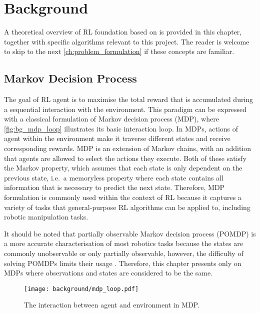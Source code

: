 \chapter{Background}\label{ch:background}

A theoretical overview of RL foundation based on \citet{sutton_reinforcement_2018} is provided in this chapter, together with specific algorithms relevant to this project. The reader is welcome to skip to the next \autoref{ch:problem_formulation} if these concepts are familiar.


\section{Markov Decision Process}

The goal of RL agent is to maximise the total reward that is accumulated during a sequential interaction with the environment. This paradigm can be expressed with a classical formulation of Markov decision process (MDP), where \autoref{fig:bg_mdp_loop} illustrates its basic interaction loop. In MDPs, actions of agent within the environment make it traverse different states and receive corresponding rewards. MDP is an extension of Markov chains, with an addition that agents are allowed to select the actions they execute. Both of these satisfy the Markov property, which assumes that each state is only dependent on the previous state, i.e.~a memoryless property where each state contains all information that is necessary to predict the next state. Therefore, MDP formulation is commonly used within the context of RL because it captures a variety of tasks that general-purpose RL algorithms can be applied to, including robotic manipulation tasks.

It should be noted that partially observable Markov decision process (POMDP) is a more accurate characterisation of most robotics tasks because the states are commonly unobservable or only partially observable, however, the difficulty of solving POMDPs limits their usage \cite{kroemer_review_2021}. Therefore, this chapter presents only on MDPs where observations and states are considered to be the same.

\begin{figure}[ht]
    \centering
    \texttt{[image: background/mdp\_loop.pdf]}
    \caption{The interaction between agent and environment in MDP.~\protect\cite{sutton_reinforcement_2018}}
    \label{fig:bg_mdp_loop}
\end{figure}


